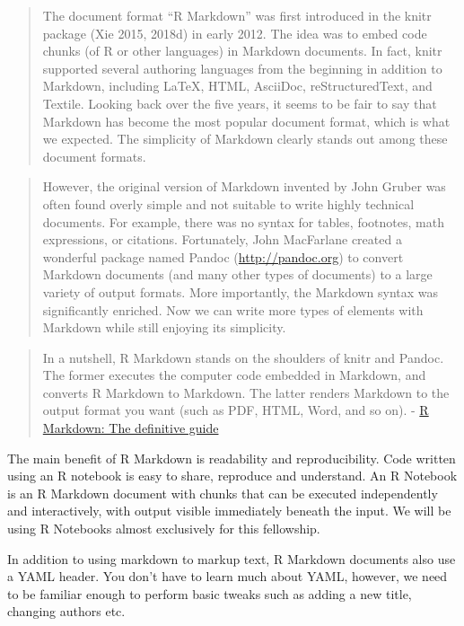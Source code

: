 \documentclass[]{article}
\begin{document}
\begin{quote}
The document format ``R Markdown'' was first introduced in the knitr
package (Xie 2015, 2018d) in early 2012. The idea was to embed code
chunks (of R or other languages) in Markdown documents. In fact, knitr
supported several authoring languages from the beginning in addition to
Markdown, including LaTeX, HTML, AsciiDoc, reStructuredText, and
Textile. Looking back over the five years, it seems to be fair to say
that Markdown has become the most popular document format, which is what
we expected. The simplicity of Markdown clearly stands out among these
document formats.
\end{quote}

\begin{quote}
However, the original version of Markdown invented by John Gruber was
often found overly simple and not suitable to write highly technical
documents. For example, there was no syntax for tables, footnotes, math
expressions, or citations. Fortunately, John MacFarlane created a
wonderful package named Pandoc (\url{http://pandoc.org}) to convert
Markdown documents (and many other types of documents) to a large
variety of output formats. More importantly, the Markdown syntax was
significantly enriched. Now we can write more types of elements with
Markdown while still enjoying its simplicity.
\end{quote}

\begin{quote}
In a nutshell, R Markdown stands on the shoulders of knitr and Pandoc.
The former executes the computer code embedded in Markdown, and converts
R Markdown to Markdown. The latter renders Markdown to the output format
you want (such as PDF, HTML, Word, and so on). -
\href{https://bookdown.org/yihui/rmarkdown/}{R Markdown: The definitive
guide}
\end{quote}

The main benefit of R Markdown is readability and reproducibility. Code
written using an R notebook is easy to share, reproduce and understand.
An R Notebook is an R Markdown document with chunks that can be executed
independently and interactively, with output visible immediately beneath
the input. We will be using R Notebooks almost exclusively for this
fellowship.

In addition to using markdown to markup text, R Markdown documents also
use a YAML header. You don't have to learn much about YAML, however, we
need to be familiar enough to perform basic tweaks such as adding a new
title, changing authors etc.
\end{document}
